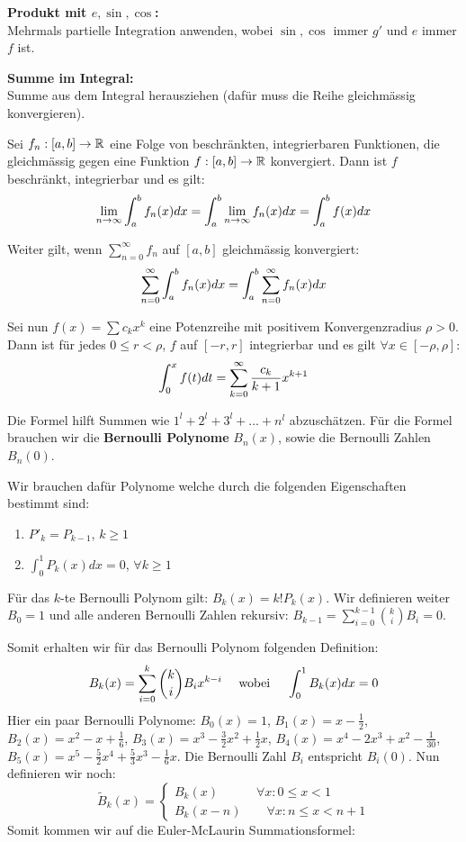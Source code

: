 \textbf{Produkt mit $e, \sin, \cos$:} \smallskip \\
Mehrmals partielle Integration anwenden, wobei $\sin, \cos$ immer $g'$ und $e$ immer $f$ ist. \smallskip

\textbf{Summe im Integral:} \smallskip \\
Summe aus dem Integral herausziehen (dafür muss die Reihe gleichmässig konvergieren). \smallskip



Sei $f_n : [a,b] \to \mathbb{R}$ eine Folge von beschränkten, integrierbaren Funktionen, die gleichmässig
gegen eine Funktion $f : [a,b] \to \mathbb{R}$ konvergiert. Dann ist $f$ beschränkt, integrierbar und es gilt:
$$\lim_{n \rightarrow \infty} \int_a^b f_n(x)dx = \int_a^b \lim_{n \rightarrow \infty} f_n(x)dx = \int_a^b f(x)dx$$

Weiter gilt, wenn $\sum_{n = 0}^{\infty} f_n$ auf $[a,b]$ gleichmässig konvergiert:
$$\sum\limits_{n = 0}^{\infty} \int_a^b f_n(x)dx = \int_a^b \sum\limits_{n = 0}^{\infty} f_n(x)dx$$

Sei nun $f(x) = \sum c_k x^k$ eine Potenzreihe mit positivem Konvergenzradius $\rho > 0$. Dann ist
für jedes $0 \leq r < \rho$, $f$ auf $[-r, r]$ integrierbar und es gilt $\forall x \in [- \rho, \rho]$:
$$\int_0^x f(t)dt = \sum\limits_{k = 0}^{\infty} \frac{c_k}{k + 1}x^{k + 1}$$


\columnbreak



Die Formel hilft Summen wie $1^l + 2^l + 3^l + ... + n^l$ abzuschätzen. Für die Formel brauchen wir
die \textbf{Bernoulli Polynome} $B_n(x)$, sowie die Bernoulli Zahlen $B_n(0)$.

Wir brauchen dafür Polynome welche durch die folgenden Eigenschaften bestimmt sind:
\begin{enumerate}[label=(\arabic*)]
    \item $P'_k = P_{k-1}$, $k \geq 1$
    \item $\int_0^1 P_k(x)dx = 0$, $\forall k \geq 1$
\end{enumerate}

Für das $k$-te Bernoulli Polynom gilt: $B_k(x) = k!P_k(x)$. Wir definieren weiter $B_0 = 1$ und alle
anderen Bernoulli Zahlen rekursiv: $B_{k-1} = \sum_{i = 0}^{k-1} \binom{k}{i} B_i = 0$. 

Somit erhalten wir für das Bernoulli Polynom folgenden Definition:
$$B_k(x) = \sum\limits_{i = 0}^{k} \binom{k}{i} B_i x^{k-i} \quad \text{ wobei } \quad \int_0^1 B_k(x)dx = 0$$
Hier ein paar Bernoulli Polynome: $B_0(x) = 1$, $B_1(x) = x - \frac{1}{2}$, $B_2(x) = x^2 - x + \frac{1}{6}$,
$B_3(x) = x^3 - \frac{3}{2}x^2 + \frac{1}{2}x$, $B_4(x) = x^4 - 2x^3 + x^2 - \frac{1}{30}$, $B_5(x) =
x^5 - \frac{5}{2}x^4 + \frac{5}{3}x^3 - \frac{1}{6}x$. Die Bernoulli Zahl $B_i$ entspricht $B_i(0)$.
Nun definieren wir noch:
$$\tilde{B}_k(x) = \begin{cases}
    B_k(x) \quad \quad \quad \forall x : 0 \leq x < 1 \\
    B_k(x - n) \quad \quad \forall x : n \leq x < n + 1
\end{cases}$$
Somit kommen wir auf die Euler-McLaurin Summationsformel:

